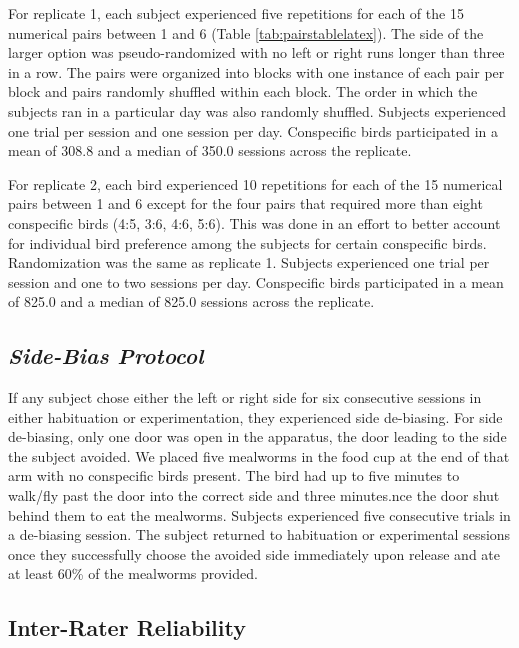 \documentclass[
  ,pub,floatsintext]{apa6}
\begin{document}
For replicate 1, each subject experienced five repetitions for each of the 15 numerical pairs between 1 and 6 (Table \ref{tab:pairstablelatex}). The side of the larger option was pseudo-randomized with no left or right runs longer than three in a row. The pairs were organized into blocks with one instance of each pair per block and pairs randomly shuffled within each block. The order in which the subjects ran in a particular day was also randomly shuffled. Subjects experienced one trial per session and one session per day. Conspecific birds participated in a mean of 308.8 and a median of 350.0 sessions across the replicate.

For replicate 2, each bird experienced 10 repetitions for each of the 15 numerical pairs between 1 and 6 except for the four pairs that required more than eight conspecific birds (4:5, 3:6, 4:6, 5:6). This was done in an effort to better account for individual bird preference among the subjects for certain conspecific birds. Randomization was the same as replicate 1. Subjects experienced one trial per session and one to two sessions per day. Conspecific birds participated in a mean of 825.0 and a median of 825.0 sessions across the replicate.

\hypertarget{side-bias-protocol-1}{%
\subsection{\texorpdfstring{\emph{Side-Bias Protocol}}{Side-Bias Protocol}}\label{side-bias-protocol-1}}

If any subject chose either the left or right side for six consecutive sessions in either habituation or experimentation, they experienced side de-biasing. For side de-biasing, only one door was open in the apparatus, the door leading to the side the subject avoided. We placed five mealworms in the food cup at the end of that arm with no conspecific birds present. The bird had up to five minutes to walk/fly past the door into the correct side and three minutes.nce the door shut behind them to eat the mealworms. Subjects experienced five consecutive trials in a de-biasing session. The subject returned to habituation or experimental sessions once they successfully choose the avoided side immediately upon release and ate at least 60\% of the mealworms provided.

\hypertarget{inter-rater-reliability}{%
\subsection{Inter-Rater Reliability}\label{inter-rater-reliability}}
\end{document}
